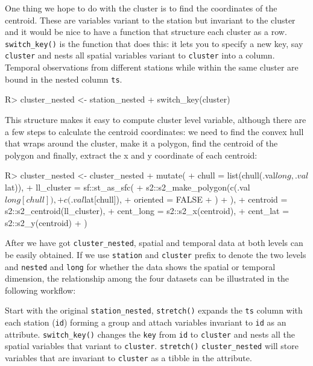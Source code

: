 \documentclass[
]{jss}
\begin{document}
One thing we hope to do with the cluster is to find the coordinates of
the centroid. These are variables variant to the station but invariant
to the cluster and it would be nice to have a function that structure
each cluster as a row. \texttt{switch\_key()} is the function that does
this: it lets you to specify a new key, say \texttt{cluster} and nests
all spatial variables variant to \texttt{cluster} into a column.
Temporal observations from different stations while within the same
cluster are bound in the nested column \texttt{ts}.

\begin{CodeChunk}
\begin{CodeInput}
R> cluster_nested <- station_nested %
+   switch_key(cluster)
\end{CodeInput}
\end{CodeChunk}

This structure makes it easy to compute cluster level variable, although
there are a few steps to calculate the centroid coordinates: we need to
find the convex hull that wraps around the cluster, make it a polygon,
find the centroid of the polygon and finally, extract the x and y
coordinate of each centroid:

\begin{CodeChunk}
\begin{CodeInput}
R> cluster_nested <- cluster_nested %
+   mutate(
+     chull = list(chull(.val$long, .val$lat)),
+     ll_cluster = sf::st_as_sfc(
+       s2::s2_make_polygon(c(.val$long[chull]),
+         c(.val$lat[chull]),
+         oriented = FALSE
+       )
+     ),
+     centroid = s2::s2_centroid(ll_cluster),
+     cent_long = s2::s2_x(centroid),
+     cent_lat = s2::s2_y(centroid)
+   )
\end{CodeInput}
\end{CodeChunk}

After we have got \texttt{cluster\_nested}, spatial and temporal data at
both levels can be easily obtained. If we use \texttt{station} and
\texttt{cluster} prefix to denote the two levels and \texttt{nested} and
\texttt{long} for whether the data shows the spatial or temporal
dimension, the relationship among the four datasets can be illustrated
in the following workflow:

Start with the original \texttt{station\_nested}, \texttt{stretch()}
expands the \texttt{ts} column with each station (\texttt{id}) forming a
group and attach variables invariant to \texttt{id} as an attribute.
\texttt{switch\_key()} changes the \texttt{key} from \texttt{id} to
\texttt{cluster} and nests all the spatial variables that variant to
\texttt{cluster}. \texttt{stretch()} \texttt{cluster\_nested} will store
variables that are invariant to \texttt{cluster} as a tibble in the
attribute.
\end{document}
